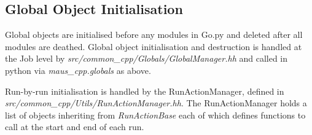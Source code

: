 \subsection{Global Object Initialisation}
Global objects are initialised before any modules in Go.py and deleted after all modules are deathed. Global object initialisation and destruction is handled at the Job level by \emph{src/common_cpp/Globals/GlobalManager.hh} and called in python via \emph{maus_cpp.globals} as above.

Run-by-run initialisation is handled by the RunActionManager, defined in \emph{src/common_cpp/Utils/RunActionManager.hh}. The RunActionManager holds a list of objects inheriting from \emph{RunActionBase} each of which defines functions to call at the start and end of each run.


